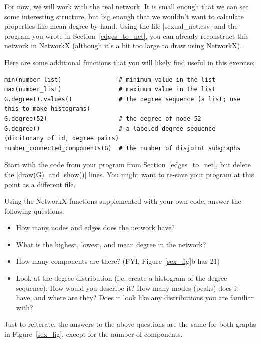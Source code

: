 \documentclass{article}
\begin{document}
For now, we will work with the real network.  It is small enough that we can see some 
interesting structure, but big enough that we wouldn't want to calculate properties like mean degree by hand. 
 Using the file |sexual_net.csv| and the program you wrote in Section~\ref{edges_to_net}, you can already reconstruct this network 
in NetworkX (although it's a bit too large to draw using NetworkX).

Here are some additional functions that you will likely find useful in this exercise:
\begin{Verbatim}[samepage=true]
min(number_list)                # minimum value in the list
max(number_list)                # maximum value in the list
G.degree().values()             # the degree sequence (a list; use this to make histograms)
G.degree(52)                    # the degree of node 52
G.degree()                      # a labeled degree sequence (dicitonary of id, degree pairs)
number_connected_components(G)  # the number of disjoint subgraphs
\end{Verbatim}

Start with the code from your program from Section~\ref{edges_to_net}, but delete the |draw(G)| and |show()| lines.  You might want to re-save your 
program at this point as a different file.

Using the NetworkX functions supplemented with your own code, answer the following questions:
\begin{itemize}
 \item How many nodes and edges does the network have?
 \item What is the highest, lowest, and mean degree in the network?
 \item How many components are there?  (FYI, Figure~\ref{sex_fig}b has 21)
 \item Look at the degree distribution (i.e. create a histogram of the degree sequence).  How would you describe it?  How many modes (peaks) 
does it have, and where are they?  Does it look like any distributions you are familiar with?
\end{itemize}

Just to reiterate, the answers to the above questions are the same for both graphs in Figure~\ref{sex_fig}, except for the number of components.
\end{document}
